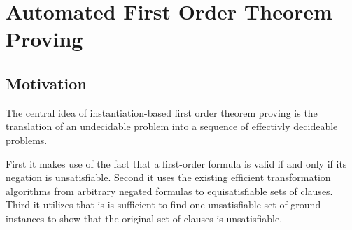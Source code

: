 
\chapter{Automated First Order Theorem Proving}



\section{Motivation}

The central idea of instantiation-based first order theorem proving is the
translation of an undecidable problem into a sequence of effectivly decideable problems.

First it makes use of the fact that a first-order formula is valid if and only if its negation is unsatisfiable.
Second it uses the existing efficient transformation algorithms from arbitrary negated formulas to equisatisfiable sets of clauses.
Third it utilizes that is is sufficient to find one unsatisfiable set of ground instances 
to show that the original set of clauses is unsatisfiable.



